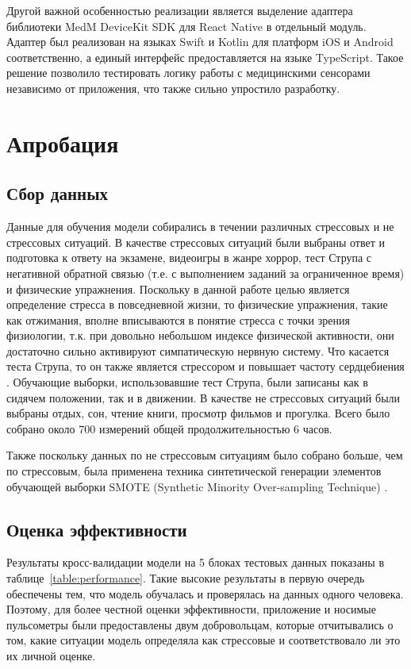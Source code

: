 \documentclass[14pt]{matmex-diploma-custom}
\begin{document}
Другой важной особенностью реализации является выделение адаптера библиотеки
MedM DeviceKit SDK для React Native в отдельный модуль. Адаптер был реализован
на языках Swift и Kotlin для платформ iOS и Android соответственно, а единый
интерфейс предоставляется на языке TypeScript. Такое решение позволило
тестировать логику работы с медицинскими сенсорами независимо от приложения, что
также сильно упростило разработку.

\section{Апробация}
\subsection{Сбор данных}
Данные для обучения модели собирались в течении различных стрессовых и не
стрессовых ситуаций. В качестве стрессовых ситуаций были выбраны ответ и
подготовка к ответу на экзамене, видеоигры в жанре хоррор, тест Струпа с
негативной обратной связью (т.е. с выполнением заданий за ограниченное время) и
физические упражнения. Поскольку в данной работе целью является определение
стресса в повседневной жизни, то физические упражнения, такие как отжимания,
вполне вписываются в понятие стресса с точки зрения физиологии, т.к. при
довольно небольшом индексе физической активности, они достаточно сильно
активируют симпатическую нервную систему. Что касается теста Струпа, то он также
является стрессором и повышает частоту сердцебиения \cite{article:stroop}.
Обучающие выборки, использовавшие тест Струпа, были записаны как в сидячем
положении, так и в движении. В качестве не стрессовых ситуаций были выбраны
отдых, сон, чтение книги, просмотр фильмов и прогулка. Всего было собрано около
700 измерений общей продолжительностью 6 часов.

Также поскольку данных по не стрессовым ситуациям было собрано больше, чем по
стрессовым, была применена техника синтетической генерации элементов обучающей
выборки SMOTE (Synthetic Minority Over-sampling Technique) \cite{article:smote}.

\subsection{Оценка эффективности}
Результаты кросс-валидации модели на 5 блоках тестовых данных показаны в
таблице~\ref{table:performance}. Такие высокие результаты в первую очередь
обеспечены тем, что модель обучалась и проверялась на данных одного человека.
Поэтому, для более честной оценки эффективности, приложение и носимые
пульсометры были предоставлены двум добровольцам, которые отчитывались о том,
какие ситуации модель определяла как стрессовые и соответствовало ли это их
личной оценке.
\end{document}
